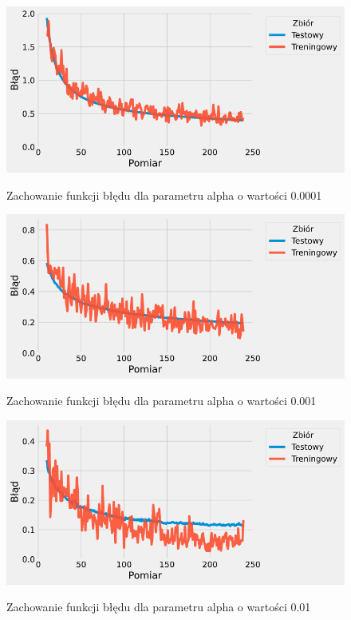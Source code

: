 \documentclass{article}
\begin{document}
\begin{figure}[H]
	\centering
	\caption{Zachowanie funkcji błędu dla parametru alpha o wartości 0.0001}
	\includegraphics[width=\textwidth]{alpha_err_00001.png}
	\label{fig:res43}
\end{figure}
\begin{figure}[H]
	\centering
	\caption{Zachowanie funkcji błędu dla parametru alpha o wartości 0.001}
	\includegraphics[width=\textwidth]{alpha_err_0001.png}
	\label{fig:res44}
\end{figure}
\begin{figure}[H]
	\centering
	\caption{Zachowanie funkcji błędu dla parametru alpha o wartości 0.01}
	\includegraphics[width=\textwidth]{alpha_err_001.png}
	\label{fig:res45}
\end{figure}
\end{document}
